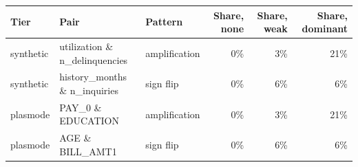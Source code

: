 \begin{tabular}{lllrrr}
\toprule
\textbf{Tier} & \textbf{Pair} & \textbf{Pattern} & \textbf{Share, none} & \textbf{Share, weak} & \textbf{Share, dominant} \\
\midrule
synthetic & utilization \& n\_delinquencies & amplification & 0\% & 3\% & 21\% \\
synthetic & history\_months \& n\_inquiries & sign flip & 0\% & 6\% & 6\% \\
plasmode & PAY\_0 \& EDUCATION & amplification & 0\% & 3\% & 21\% \\
plasmode & AGE \& BILL\_AMT1 & sign flip & 0\% & 6\% & 6\% \\
\bottomrule
\end{tabular}
